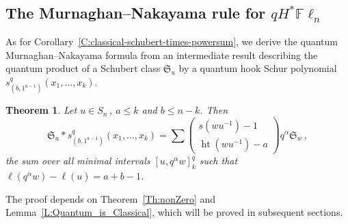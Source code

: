 \documentclass[11pt]{article}
\newtheorem{theorem}[theo]{Theorem}
\theoremstyle{definition}
\numberwithin{equation}{section}
\newcommand{\Fln}{{\mathbb F}\ell_n}
\newcommand{\frakS}{{\mathfrak S}}
\DeclareMathOperator{\het}{ht}
\begin{document}
\subsection{The Murnaghan--Nakayama rule for \texorpdfstring{$qH^*\Fln$}{qH*Fln}}

As for Corollary~\ref{C:classical-schubert-times-powersum},
we derive the quantum Murnaghan--Nakayama formula from an intermediate result
describing the quantum product of a Schubert class $\frakS_u$ by a quantum hook Schur
polynomial $s_{(b, 1^{a-1})}^q(x_1,\dotsc,x_k)$.

\begin{theorem}
    \label{thm:q_hook_product}
    Let $u \in S_n$\,, $a \leq k$ and $b \leq n-k$. Then
    \begin{equation*}
        \frakS_u
        \ast
        s^q_{(b,1^{a-1})} (x_1, \dots, x_k)
        = \sum
        \left(\begin{smallmatrix} s(wu^{-1})-1 \\ \het(wu^{-1})-a \end{smallmatrix}\right)
        q^\alpha
        \frakS_{w}\,,
    \end{equation*}
    the sum over all minimal intervals $[u,  q^{\alpha}w]_k^q$ such that $\ell(q^\alpha w) - \ell(u)= a{+}b{-}1$.
\end{theorem}

The proof depends on  Theorem~\ref{Th:nonZero} and Lemma~\ref{L:Quantum_is_Classical}, which will be proved in
subsequent sections.
\end{document}
